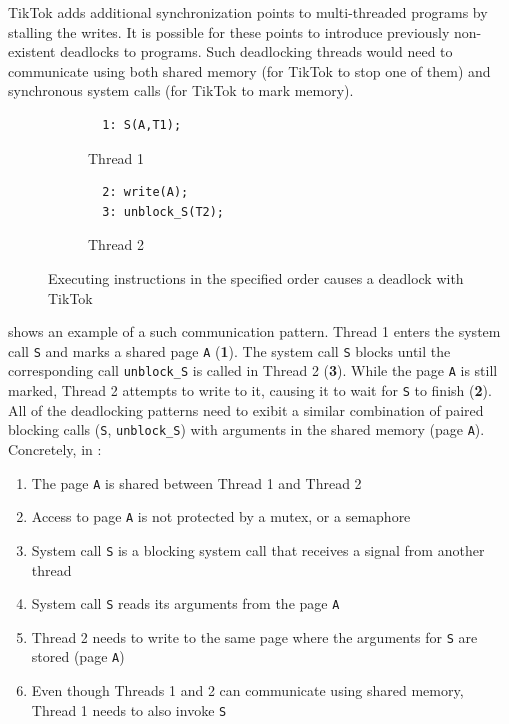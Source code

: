 TikTok adds additional synchronization points to multi-threaded programs by
stalling the writes. It is possible for these points to introduce previously
non-existent deadlocks to programs. Such deadlocking threads would need to
communicate using both shared memory (for TikTok to stop one of them) and
synchronous system calls (for TikTok to mark memory).

\begin{figure}
  \centering
  \begin{subfigure}[b]{0.45\linewidth}
  \begin{minipage}{\linewidth}
  \begin{lstlisting}
  1: S(A,T1);  
  \end{lstlisting}
  \end{minipage}
  \caption{Thread 1}
  \end{subfigure}
  \hfill
  \begin{subfigure}[b]{0.45\linewidth}
  \begin{minipage}{\linewidth}
  \begin{lstlisting}
  2: write(A);
  3: unblock_S(T2);
  \end{lstlisting}  
  \end{minipage}
  \caption{Thread 2}
  \end{subfigure}
  \caption{Executing instructions in the specified order causes a deadlock with TikTok}
  \label{fig:deadlock}
\end{figure}


 shows an example of a such communication pattern. Thread 1
enters the system call \texttt{S} and marks a shared page \texttt{A} (\textbf{1}). The
system call \texttt{S} blocks until the corresponding call \texttt{unblock\_S} is called
in Thread 2 (\textbf{3}). While the page \texttt{A} is still marked, Thread 2
attempts to write to it, causing it to wait for \texttt{S} to finish
(\textbf{2}). All of the deadlocking patterns need to exibit a similar combination
of paired blocking calls (\texttt{S}, \texttt{unblock\_S}) with arguments in the shared
memory (page \texttt{A}). Concretely, in :

\begin{enumerate}
    \item The page \texttt{A} is shared between Thread 1 and Thread 2
    \item Access to page \texttt{A} is not protected by a mutex, or a semaphore
    \item System call \texttt{S} is a blocking system call that receives a 
    signal from another thread
    \item System call \texttt{S} reads its arguments from the page \texttt{A}
    \item Thread 2 needs to write to the same page where the arguments for 
    \texttt{S} are stored (page \texttt{A})
    \item Even though Threads 1 and 2 can communicate using shared memory, 
    Thread 1 needs to also invoke \texttt{S}
\end{enumerate}

